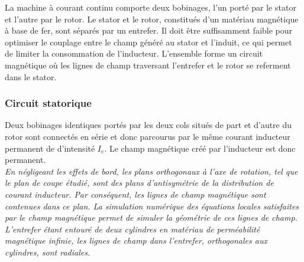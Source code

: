 \documentclass[11pt,a4paper]{report}
\begin{document}
La machine à courant continu comporte deux bobinages, l'un porté par le stator et l'autre par
le rotor. Le stator et le rotor, constitués d'un matériau magnétique à base de fer, sont séparés par
un entrefer. Il doit être suffisamment faible pour optimiser le couplage entre le champ généré au stator et l'induit, ce qui permet de limiter la consommation de l'inducteur. L'ensemble forme un circuit magnétique où les lignes de champ traversant l'entrefer et le rotor se referment dans le stator.

\subsubsection*{Circuit statorique}

Deux bobinages identiques portés par les deux cols situés de part et d'autre du rotor sont connectés
en série et donc parcourus par le même courant inducteur permanent de d'intensité $I_e$. Le champ magnétique créé par l'inducteur est donc permanent.\\ 

\textit{En négligeant les effets de bord, les plans orthogonaux à l'axe de rotation, tel que le plan de coupe étudié, sont des plans d'antisymétrie de la distribution de courant inducteur. Par conséquent, les lignes de champ magnétique sont contenues dans ce plan. La simulation numérique des équations locales satisfaites par le champ magnétique permet de simuler la géométrie de ces lignes de champ. L'entrefer étant entouré de deux cylindres en matériau de perméabilité magnétique infinie, les lignes de champ dans l'entrefer, orthogonales aux cylindres, sont radiales.}
\end{document}

